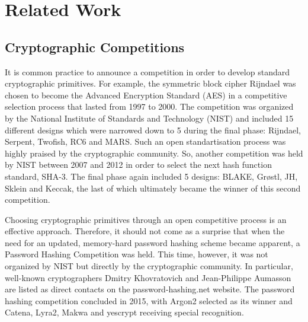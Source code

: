 \chapter{Related Work}
\label{chapter:related-work}

\section{Cryptographic Competitions}

It is common practice to announce a competition in order to develop standard cryptographic primitives. For example, the symmetric block cipher Rijndael was chosen to become the Advanced Encryption Standard (AES) in a competitive selection process that lasted from 1997 to 2000. The competition was organized by the National Institute of Standards and Technology (NIST) and included 15 different designs which were narrowed down to 5 during the final phase: Rijndael, Serpent, Twofish, RC6 and MARS. Such an open standartisation process was highly praised by the cryptographic community. So, another competition was held by NIST between 2007 and 2012 in order to select the next hash function standard, SHA-3. The final phase again included 5 designs: BLAKE, Grøstl, JH, Sklein and Keccak, the last of which ultimately became the winner of this second competition.

Choosing cryptographic primitives through an open competitive process is an effective approach. Therefore, it should not come as a surprise that when the need for an updated, memory-hard password hashing scheme became apparent, a Password Hashing Competition was held. This time, however, it was not organized by NIST but directly by the cryptographic community. In particular, well-known cryptographers Dmitry Khovratovich and Jean-Philippe Aumasson are listed as direct contacts on the password-hashing.net website. The password hashing competition concluded in 2015, with Argon2 selected as its winner and Catena, Lyra2, Makwa and yescrypt receiving special recognition. 
